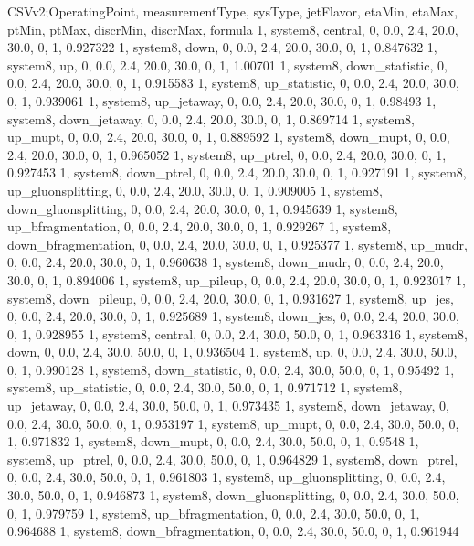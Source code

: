 CSVv2;OperatingPoint, measurementType, sysType, jetFlavor, etaMin, etaMax, ptMin, ptMax, discrMin, discrMax, formula
1, system8, central,    0, 0.0, 2.4, 20.0, 30.0, 0, 1, 0.927322
1, system8, down,       0, 0.0, 2.4, 20.0, 30.0, 0, 1, 0.847632
1, system8, up,         0, 0.0, 2.4, 20.0, 30.0, 0, 1, 1.00701
1, system8, down_statistic,       0, 0.0, 2.4, 20.0, 30.0, 0, 1, 0.915583
1, system8, up_statistic,         0, 0.0, 2.4, 20.0, 30.0, 0, 1, 0.939061
1, system8, up_jetaway,      0, 0.0, 2.4, 20.0, 30.0, 0, 1, 0.98493
1, system8, down_jetaway,    0, 0.0, 2.4, 20.0, 30.0, 0, 1, 0.869714
1, system8, up_mupt,         0, 0.0, 2.4, 20.0, 30.0, 0, 1, 0.889592
1, system8, down_mupt,       0, 0.0, 2.4, 20.0, 30.0, 0, 1, 0.965052
1, system8, up_ptrel,        0, 0.0, 2.4, 20.0, 30.0, 0, 1, 0.927453
1, system8, down_ptrel,      0, 0.0, 2.4, 20.0, 30.0, 0, 1, 0.927191
1, system8, up_gluonsplitting, 0, 0.0, 2.4, 20.0, 30.0, 0, 1, 0.909005
1, system8, down_gluonsplitting, 0, 0.0, 2.4, 20.0, 30.0, 0, 1, 0.945639
1, system8, up_bfragmentation, 0, 0.0, 2.4, 20.0, 30.0, 0, 1, 0.929267
1, system8, down_bfragmentation, 0, 0.0, 2.4, 20.0, 30.0, 0, 1, 0.925377
1, system8, up_mudr,         0, 0.0, 2.4, 20.0, 30.0, 0, 1, 0.960638
1, system8, down_mudr,       0, 0.0, 2.4, 20.0, 30.0, 0, 1, 0.894006
1, system8, up_pileup,       0, 0.0, 2.4, 20.0, 30.0, 0, 1, 0.923017
1, system8, down_pileup,     0, 0.0, 2.4, 20.0, 30.0, 0, 1, 0.931627
1, system8, up_jes,          0, 0.0, 2.4, 20.0, 30.0, 0, 1, 0.925689
1, system8, down_jes,        0, 0.0, 2.4, 20.0, 30.0, 0, 1, 0.928955
1, system8, central,    0, 0.0, 2.4, 30.0, 50.0, 0, 1, 0.963316
1, system8, down,       0, 0.0, 2.4, 30.0, 50.0, 0, 1, 0.936504
1, system8, up,         0, 0.0, 2.4, 30.0, 50.0, 0, 1, 0.990128
1, system8, down_statistic,       0, 0.0, 2.4, 30.0, 50.0, 0, 1, 0.95492
1, system8, up_statistic,         0, 0.0, 2.4, 30.0, 50.0, 0, 1, 0.971712
1, system8, up_jetaway,      0, 0.0, 2.4, 30.0, 50.0, 0, 1, 0.973435
1, system8, down_jetaway,    0, 0.0, 2.4, 30.0, 50.0, 0, 1, 0.953197
1, system8, up_mupt,         0, 0.0, 2.4, 30.0, 50.0, 0, 1, 0.971832
1, system8, down_mupt,       0, 0.0, 2.4, 30.0, 50.0, 0, 1, 0.9548
1, system8, up_ptrel,        0, 0.0, 2.4, 30.0, 50.0, 0, 1, 0.964829
1, system8, down_ptrel,      0, 0.0, 2.4, 30.0, 50.0, 0, 1, 0.961803
1, system8, up_gluonsplitting, 0, 0.0, 2.4, 30.0, 50.0, 0, 1, 0.946873
1, system8, down_gluonsplitting, 0, 0.0, 2.4, 30.0, 50.0, 0, 1, 0.979759
1, system8, up_bfragmentation, 0, 0.0, 2.4, 30.0, 50.0, 0, 1, 0.964688
1, system8, down_bfragmentation, 0, 0.0, 2.4, 30.0, 50.0, 0, 1, 0.961944
